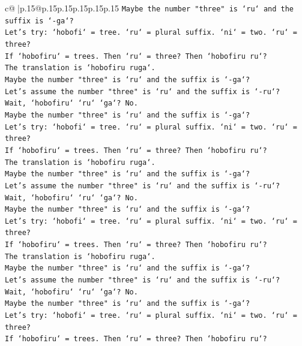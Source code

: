 \documentclass{article}
\begin{document}
{\begin{supertabular}{c@{$\;$}|p{.15\linewidth}@{}p{.15\linewidth}p{.15\linewidth}p{.15\linewidth}p{.15\linewidth}p{.15\linewidth}}
{{{\texttt{Maybe the number "three" is `ru` and the suffix is `{-}ga`?} \\
\texttt{Let's try: `hobofi` = tree. `ru` = plural suffix. `ni` = two. `ru` = three?} \\
\texttt{If `hobofiru` = trees. Then `ru` = three? Then `hobofiru ru`?} \\
\texttt{The translation is `hobofiru ruga`.} \\
\texttt{Maybe the number "three" is `ru` and the suffix is `{-}ga`?} \\
\texttt{Let's assume the number "three" is `ru` and the suffix is `{-}ru`?} \\
\texttt{Wait, `hobofiru` `ru` `ga`? No.} \\
\texttt{Maybe the number "three" is `ru` and the suffix is `{-}ga`?} \\
\texttt{Let's try: `hobofi` = tree. `ru` = plural suffix. `ni` = two. `ru` = three?} \\
\texttt{If `hobofiru` = trees. Then `ru` = three? Then `hobofiru ru`?} \\
\texttt{The translation is `hobofiru ruga`.} \\
\texttt{Maybe the number "three" is `ru` and the suffix is `{-}ga`?} \\
\texttt{Let's assume the number "three" is `ru` and the suffix is `{-}ru`?} \\
\texttt{Wait, `hobofiru` `ru` `ga`? No.} \\
\texttt{Maybe the number "three" is `ru` and the suffix is `{-}ga`?} \\
\texttt{Let's try: `hobofi` = tree. `ru` = plural suffix. `ni` = two. `ru` = three?} \\
\texttt{If `hobofiru` = trees. Then `ru` = three? Then `hobofiru ru`?} \\
\texttt{The translation is `hobofiru ruga`.} \\
\texttt{Maybe the number "three" is `ru` and the suffix is `{-}ga`?} \\
\texttt{Let's assume the number "three" is `ru` and the suffix is `{-}ru`?} \\
\texttt{Wait, `hobofiru` `ru` `ga`? No.} \\
\texttt{Maybe the number "three" is `ru` and the suffix is `{-}ga`?} \\
\texttt{Let's try: `hobofi` = tree. `ru` = plural suffix. `ni` = two. `ru` = three?} \\
\texttt{If `hobofiru` = trees. Then `ru` = three? Then `hobofiru ru`?} \\
}}}
\end{supertabular}}
\end{document}

